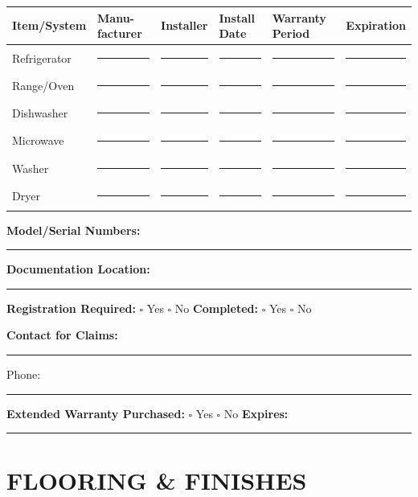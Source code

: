 \documentclass[11pt,letterpaper]{article}
\begin{document}
\begin{tabular}{|p{1.5in}|p{1in}|p{1in}|p{0.8in}|p{0.8in}|p{1in}|}
\hline
\textbf{Item/System} & \textbf{Manu-facturer} & \textbf{Installer} & \textbf{Install Date} & \textbf{Warranty Period} & \textbf{Expiration} \\
\hline
Refrigerator & \rule{0.8in}{0.4pt} & \rule{0.8in}{0.4pt} & \rule{0.6in}{0.4pt} & \rule{0.6in}{0.4pt} & \rule{0.8in}{0.4pt} \\
\hline
Range/Oven & \rule{0.8in}{0.4pt} & \rule{0.8in}{0.4pt} & \rule{0.6in}{0.4pt} & \rule{0.6in}{0.4pt} & \rule{0.8in}{0.4pt} \\
\hline
Dishwasher & \rule{0.8in}{0.4pt} & \rule{0.8in}{0.4pt} & \rule{0.6in}{0.4pt} & \rule{0.6in}{0.4pt} & \rule{0.8in}{0.4pt} \\
\hline
Microwave & \rule{0.8in}{0.4pt} & \rule{0.8in}{0.4pt} & \rule{0.6in}{0.4pt} & \rule{0.6in}{0.4pt} & \rule{0.8in}{0.4pt} \\
\hline
Washer & \rule{0.8in}{0.4pt} & \rule{0.8in}{0.4pt} & \rule{0.6in}{0.4pt} & \rule{0.6in}{0.4pt} & \rule{0.8in}{0.4pt} \\
\hline
Dryer & \rule{0.8in}{0.4pt} & \rule{0.8in}{0.4pt} & \rule{0.6in}{0.4pt} & \rule{0.6in}{0.4pt} & \rule{0.8in}{0.4pt} \\
\hline
\end{tabular}

\vspace{6pt}

\textbf{Model/Serial Numbers:} \rule{9cm}{0.4pt}

\textbf{Documentation Location:} \rule{8cm}{0.4pt}

\textbf{Registration Required:} $\square$ Yes $\square$ No \hspace{0.3in} \textbf{Completed:} $\square$ Yes $\square$ No

\textbf{Contact for Claims:} \rule{7cm}{0.4pt} Phone: \rule{3cm}{0.4pt}

\textbf{Extended Warranty Purchased:} $\square$ Yes $\square$ No \hspace{0.2in} \textbf{Expires:} \rule{3cm}{0.4pt}

\vspace{12pt}

\section*{FLOORING \& FINISHES}
\end{document}

